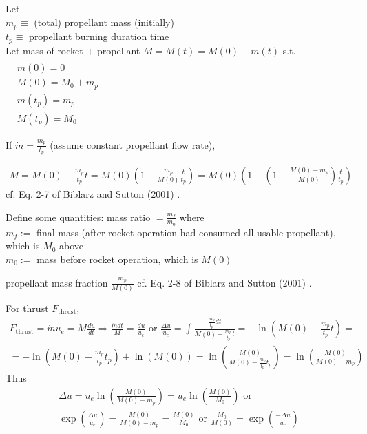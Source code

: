 \documentclass[10pt]{amsart}
\begin{document}
\begin{multicols*}{2}
Let \\
$m_p \equiv $ (total) propellant mass (initially) \\
$t_p \equiv$ propellant burning duration time  \\
Let mass of rocket $+$ propellant $M=M(t) = M(0) -m(t)$ s.t. $\begin{aligned} & \quad \\
  & m(0) = 0 \\
  & M(0) = M_0 +m_p \\
  & m(t_p) = m_p \\
  & M(t_p) = M_0 \end{aligned}$

If $\dot{m} = \frac{m_p}{t_p}$ (assume constant propellant flow rate),

\[
\begin{gathered}
  M=M(0) - \frac{m_p}{t_p}t = M(0)\left( 1 - \frac{m_p}{M(0)} \frac{t}{t_p} \right) = M(0) \left( 1 - \left( 1 - \frac{M(0) - m_p}{M(0) } \right) \frac{t}{t_p} \right)
\end{gathered}
\]
cf. Eq. 2-7 of Biblarz and Sutton (2001) \cite{GSuttonOBiblarz2001}.

Define some quantities:  mass ratio $= \frac{m_f}{m_0}$ where \\
$m_f := $ final mass (after rocket operation had consumed all usable propellant), which is $M_0$ above \\
$m_0 := $ mass before rocket operation, which is $M(0)$

propellant mass fraction $\frac{m_p}{M(0)}$ cf. Eq. 2-8 of Biblarz and Sutton (2001) \cite{GSuttonOBiblarz2001}.

For thrust $F_{\text{thrust}}$,
\[
\begin{gathered}
  F_{\text{thrust}} = \dot{m}u_e = M \frac{du}{dt} \Longrightarrow \frac{\dot{m}dt }{M} = \frac{du}{u_e} \text{ or } \frac{ \Delta u  }{u_e } = \int \frac{ \frac{m_p}{t_p} dt }{ M(0) - \frac{m_p}{t_p} t } = -\ln{ (M(0)- \frac{m_p}{t_p} t )} = \\
  = -\ln{ (M(0) - \frac{m_p}{t_p} t_p ) } + \ln{(M(0))} = \ln{ \left( \frac{M(0) }{M(0) - \frac{m_p}{t_p} t_p } \right) } = \ln{ \left( \frac{M(0)}{ M(0) - m_p } \right) }
\end{gathered}
\]
Thus
\[
\begin{gathered}
  \Delta u = u_e \ln{ \left( \frac{M(0)}{ M(0) - m_p } \right) } = u_e \ln{ \left( \frac{M(0)}{ M_0} \right) } \text{ or } \\
  \exp{ \left( \frac{ \Delta u }{ u_e } \right) }  = \frac{M(0)}{M(0) - m_p } = \frac{M(0)}{M_0} \text{ or } \frac{M_0}{M(0)} = \exp{ \left( \frac{ - \Delta u}{ u_e } \right) }
\end{gathered}
\]


\end{multicols*}
\end{document}
